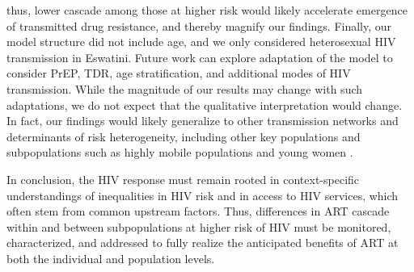 thus, lower cascade among those at higher risk
would likely accelerate emergence of transmitted drug resistance,
and thereby magnify our findings.
Finally, our model structure did not include age,
and we only considered heterosexual HIV transmission in Eswatini.
Future work can explore adaptation of the model to consider
PrEP, TDR, age stratification, and additional modes of HIV transmission.
While the magnitude of our results may change with such adaptations,
we do not expect that the qualitative interpretation would change.
In fact, our findings would likely generalize
to other transmission networks and determinants of risk heterogeneity,
including other key populations and subpopulations such as
highly mobile populations and young women \cite{Camlin2019,Cheuk2020}.
\par
In conclusion, the HIV response must remain rooted in
context-specific understandings of inequalities in HIV risk and in access to HIV services,
which often stem from common upstream factors.
Thus, differences in ART cascade within and between subpopulations at higher risk of HIV
must be monitored, characterized, and addressed
to fully realize the anticipated benefits of ART
at both the individual and population levels.
